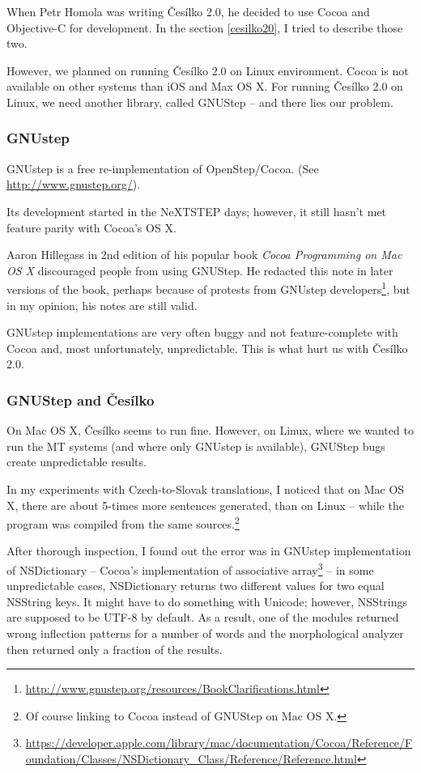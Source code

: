 When Petr Homola was writing Česílko 2.0, he decided to use Cocoa and Objective-C for development. In the section \ref{cesilko20}, I tried to describe those two.

However, we planned on running Česílko 2.0 on Linux environment. Cocoa is not available on other systems than iOS and Max OS X. For running Česílko 2.0 on Linux, we need another library, called GNUStep -- and there lies our problem.

\subsubsection{GNUstep}
GNUstep is a free re-implementation of OpenStep/Cocoa. (See \url{http://www.gnustep.org/}).

Its development started in the NeXTSTEP days; however, it still hasn't met feature parity with Cocoa's OS X.

Aaron Hillegass in 2nd edition of his popular book \emph{Cocoa Programming on Mac OS X} discouraged people from using GNUStep. He redacted this note in later versions of the book, perhaps because of protests from GNUstep developers\footnote{\url{http://www.gnustep.org/resources/BookClarifications.html}}, but in my opinion, his notes are still valid.

GNUstep implementations are very often buggy and not feature-complete with Cocoa and, most unfortunately, unpredictable. This is what hurt us with Česílko 2.0.

\subsubsection{GNUStep and Česílko}

On Mac OS X, Česílko seems to run fine.
However, on Linux, where we wanted to run the MT systems (and where only GNUstep is available), GNUStep bugs create unpredictable results.

In my experiments with Czech-to-Slovak translations, I noticed that on Mac OS X, there are about 5-times more sentences generated, than on Linux -- while the program was compiled from the same sources.\footnote{Of course linking to Cocoa instead of GNUStep on Mac OS X.}

After thorough inspection, I found out the error was in GNUstep implementation of NSDictionary -- Cocoa's implementation of associative array\footnote{\url{https://developer.apple.com/library/mac/documentation/Cocoa/Reference/Foundation/Classes/NSDictionary\_Class/Reference/Reference.html}} -- in some unpredictable cases, NSDictionary returns two different values for two equal NSString keys. It might have to do something with Unicode; however, NSStrings are supposed to be UTF-8 by default. As a result, one of the modules returned wrong inflection patterns for a number of words and the morphological analyzer then returned only a fraction of the results.

